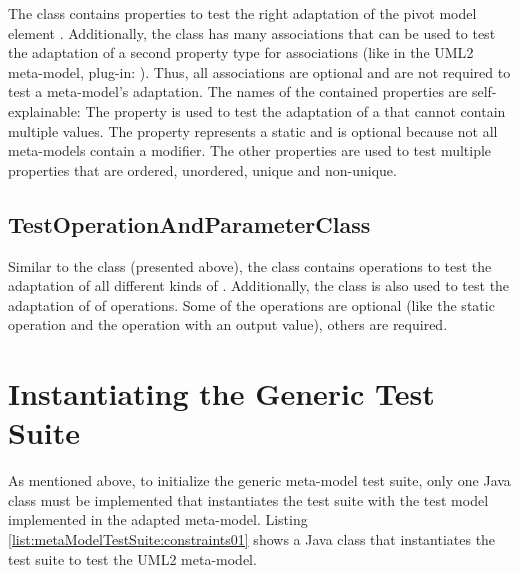 The class  contains properties to test the right adaptation of the pivot model element . Additionally, the class has many associations that can be used to test the adaptation of a second property type for associations (like in the \acs{UML}2 meta-model, plug-in: ). Thus, all associations are optional and are not required to test a meta-model's adaptation. The names of the contained properties are self-explainable: The property  is used to test the adaptation of a  that cannot contain multiple values. The property  represents a static  and is optional because not all meta-models contain a  modifier. The other properties are used to test multiple properties that are ordered, unordered, unique and non-unique.


\subsection{TestOperationAndParameterClass}

Similar to the class  (presented above), the class  contains operations to test the adaptation of all different kinds of . Additionally, the class is also used to test the adaptation of  of operations. Some of the operations are optional (like the static operation and the operation with an output value), others are required.


\section{Instantiating the Generic Test Suite}

As mentioned above, to initialize the generic meta-model test suite, only one Java class must be implemented that instantiates the test suite with the test model implemented in the adapted meta-model. Listing \ref{list:metaModelTestSuite:constraints01} shows a Java class that instantiates the test suite to test the \acs{UML}2 meta-model.

